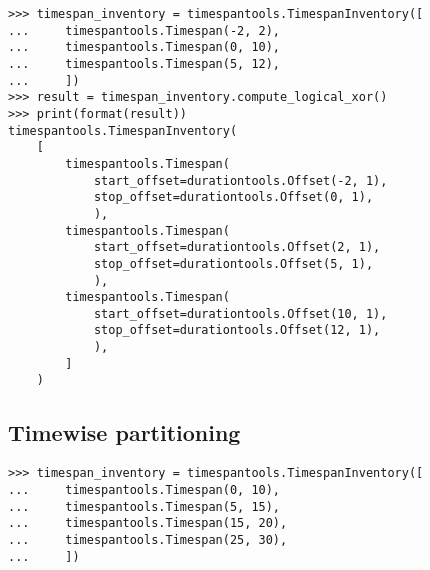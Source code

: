 \begin{comment}
<abjad>
timespan_inventory = timespantools.TimespanInventory([
    timespantools.Timespan(-2, 2),
    timespantools.Timespan(0, 10),
    timespantools.Timespan(5, 12),
    ])
result = timespan_inventory.compute_logical_xor()
print(format(result))
</abjad>
\end{comment}

\begin{singlespacing}
\vspace{-0.5\baselineskip}
\begin{lstlisting}
>>> timespan_inventory = timespantools.TimespanInventory([
...     timespantools.Timespan(-2, 2),
...     timespantools.Timespan(0, 10),
...     timespantools.Timespan(5, 12),
...     ])
>>> result = timespan_inventory.compute_logical_xor()
>>> print(format(result))
timespantools.TimespanInventory(
    [
        timespantools.Timespan(
            start_offset=durationtools.Offset(-2, 1),
            stop_offset=durationtools.Offset(0, 1),
            ),
        timespantools.Timespan(
            start_offset=durationtools.Offset(2, 1),
            stop_offset=durationtools.Offset(5, 1),
            ),
        timespantools.Timespan(
            start_offset=durationtools.Offset(10, 1),
            stop_offset=durationtools.Offset(12, 1),
            ),
        ]
    )
\end{lstlisting}
\end{singlespacing}

\subsection{Timewise partitioning} %

\begin{comment}
<abjad>
timespan_inventory = timespantools.TimespanInventory([
    timespantools.Timespan(0, 10),
    timespantools.Timespan(5, 15),
    timespantools.Timespan(15, 20),
    timespantools.Timespan(25, 30),
    ])
</abjad>
\end{comment}

\begin{singlespacing}
\vspace{-0.5\baselineskip}
\begin{lstlisting}
>>> timespan_inventory = timespantools.TimespanInventory([
...     timespantools.Timespan(0, 10),
...     timespantools.Timespan(5, 15),
...     timespantools.Timespan(15, 20),
...     timespantools.Timespan(25, 30),
...     ])
\end{lstlisting}
\end{singlespacing}

